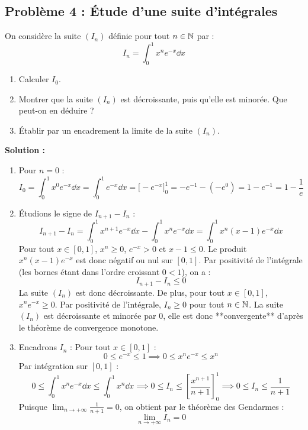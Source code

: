\subsection*{Problème 4 : Étude d'une suite d'intégrales}
On considère la suite $(I_n)$ définie pour tout $n \in \mathbb{N}$ par :
\[
I_n = \int_0^1 x^n e^{-x} \dd x
\]
\begin{enumerate}
    \item Calculer $I_0$.
    \item Montrer que la suite $(I_n)$ est décroissante, puis qu'elle est minorée. Que peut-on en déduire ?
    \item Établir par un encadrement la limite de la suite $(I_n)$.
\end{enumerate}

\textbf{Solution :}
\begin{enumerate}
    \item Pour $n = 0$ :
    \[
    I_0 = \int_0^1 x^0 e^{-x} \dd x = \int_0^1 e^{-x} \dd x = \Big[ -e^{-x} \Big]_0^1 = -e^{-1} - (-e^0) = 1 - e^{-1} = 1 - \frac{1}{e}
    \]
    
    \item Étudions le signe de $I_{n+1} - I_n$ :
    \[
    I_{n+1} - I_n = \int_0^1 x^{n+1} e^{-x} \dd x - \int_0^1 x^n e^{-x} \dd x = \int_0^1 x^n(x-1)e^{-x} \dd x
    \]
    Pour tout $x \in [0, 1]$, $x^n \ge 0$, $e^{-x} > 0$ et $x-1 \le 0$.
    Le produit $x^n(x-1)e^{-x}$ est donc négatif ou nul sur $[0,1]$.
    Par positivité de l'intégrale (les bornes étant dans l'ordre croissant $0 < 1$), on a :
    \[
    I_{n+1} - I_n \le 0
    \]
    La suite $(I_n)$ est donc décroissante.
    De plus, pour tout $x \in [0, 1]$, $x^n e^{-x} \ge 0$. Par positivité de l'intégrale, $I_n \ge 0$ pour tout $n \in \mathbb{N}$.
    La suite $(I_n)$ est décroissante et minorée par 0, elle est donc **convergente** d'après le théorème de convergence monotone.
    
    \item Encadrons $I_n$ :
    Pour tout $x \in [0, 1]$ :
    \[
    0 \le e^{-x} \le 1 \implies 0 \le x^n e^{-x} \le x^n
    \]
    Par intégration sur $[0, 1]$ :
    \[
    0 \le \int_0^1 x^n e^{-x} \dd x \le \int_0^1 x^n \dd x \implies 0 \le I_n \le \left[ \frac{x^{n+1}}{n+1} \right]_0^1 \implies 0 \le I_n \le \frac{1}{n+1}
    \]
    Puisque $\lim_{n \to +\infty} \frac{1}{n+1} = 0$, on obtient par le théorème des Gendarmes :
    \[
    \lim_{n \to +\infty} I_n = 0
    \]
\end{enumerate}

